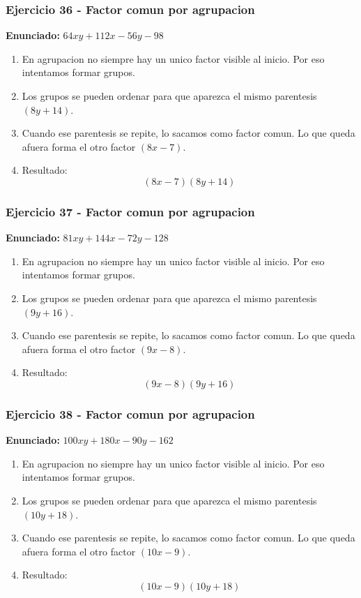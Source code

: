 \documentclass[11pt,a4paper]{article}
\begin{document}
\vspace{0.2cm}
\subsubsection*{Ejercicio 36 - Factor comun por agrupacion}
\textbf{Enunciado:} $ 64 x y + 112 x - 56 y - 98 $\par
\begin{enumerate}[leftmargin=2em]
\item En agrupacion no siempre hay un unico factor visible al inicio. Por eso intentamos formar grupos.
\item Los grupos se pueden ordenar para que aparezca el mismo parentesis \((8 y + 14)\).
\item Cuando ese parentesis se repite, lo sacamos como factor comun. Lo que queda afuera forma el otro factor \((8 x - 7)\).
\item Resultado: \[\boxed{\left(8 x - 7\right)\left(8 y + 14\right)}\]
\end{enumerate}

\vspace{0.2cm}
\subsubsection*{Ejercicio 37 - Factor comun por agrupacion}
\textbf{Enunciado:} $ 81 x y + 144 x - 72 y - 128 $\par
\begin{enumerate}[leftmargin=2em]
\item En agrupacion no siempre hay un unico factor visible al inicio. Por eso intentamos formar grupos.
\item Los grupos se pueden ordenar para que aparezca el mismo parentesis \((9 y + 16)\).
\item Cuando ese parentesis se repite, lo sacamos como factor comun. Lo que queda afuera forma el otro factor \((9 x - 8)\).
\item Resultado: \[\boxed{\left(9 x - 8\right)\left(9 y + 16\right)}\]
\end{enumerate}

\vspace{0.2cm}
\subsubsection*{Ejercicio 38 - Factor comun por agrupacion}
\textbf{Enunciado:} $ 100 x y + 180 x - 90 y - 162 $\par
\begin{enumerate}[leftmargin=2em]
\item En agrupacion no siempre hay un unico factor visible al inicio. Por eso intentamos formar grupos.
\item Los grupos se pueden ordenar para que aparezca el mismo parentesis \((10 y + 18)\).
\item Cuando ese parentesis se repite, lo sacamos como factor comun. Lo que queda afuera forma el otro factor \((10 x - 9)\).
\item Resultado: \[\boxed{\left(10 x - 9\right)\left(10 y + 18\right)}\]
\end{enumerate}
\end{document}
